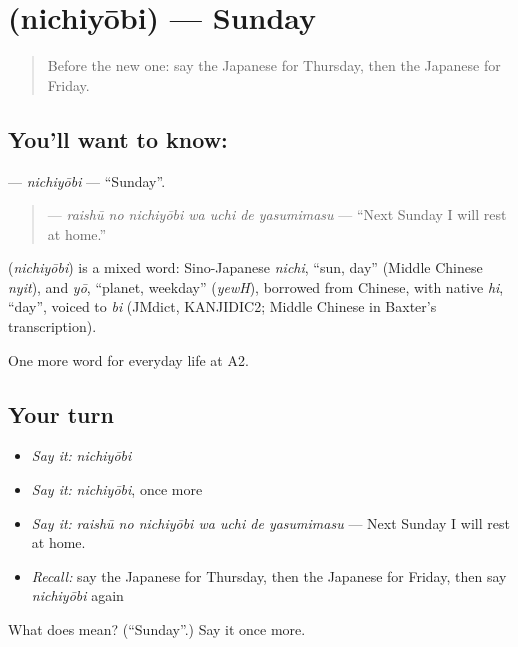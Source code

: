\section[\texorpdfstring{\ja{にちようび} (nichiyōbi)}{にちようび (nichiyōbi)}]{ (nichiyōbi) — Sunday}

\label{lesson:JA-C164-nichiyoubi}



\begin{quote}
Before the new one: say the Japanese for Thursday, then the Japanese for Friday.
\end{quote}

\subsection*{You'll want to know: }
\textbf{} — \emph{nichiyōbi} — \textquotedblleft{}Sunday\textquotedblright{}.

\begin{quote}
\textbf{   } — \emph{raishū no nichiyōbi wa uchi de yasumimasu} — \textquotedblleft{}Next Sunday I will rest at home.\textquotedblright{}
\end{quote}

\begin{cousinweb}
\textbf{} (\emph{nichiyōbi}) is a mixed word: Sino-Japanese \emph{nichi}, \textquotedblleft{}sun, day\textquotedblright{} (Middle Chinese \emph{nyit}), and \emph{yō}, \textquotedblleft{}planet, weekday\textquotedblright{} (\emph{yewH}), borrowed from Chinese, with native \emph{hi}, \textquotedblleft{}day\textquotedblright{}, voiced to \emph{bi} (JMdict, KANJIDIC2; Middle Chinese in Baxter's transcription).
\end{cousinweb}

\begin{grammarlens}[title={What you've built}]
One more word for everyday life at A2.
\end{grammarlens}

\subsection*{Your turn}
\begin{itemize}
\raggedright
  \item \emph{Say it:} \emph{nichiyōbi}
  \item \emph{Say it:} \emph{nichiyōbi}, once more
  \item \emph{Say it:} \emph{raishū no nichiyōbi wa uchi de yasumimasu} — Next Sunday I will rest at home.
  \item \emph{Recall:} say the Japanese for Thursday, then the Japanese for Friday, then say \emph{nichiyōbi} again
\end{itemize}

\begin{tcolorbox}[breakable,colback=teal!4,colframe=teal!35!black,title={Before you move on}]
What does  mean? (\textquotedblleft{}Sunday\textquotedblright{}.) Say it once more.
\end{tcolorbox}
